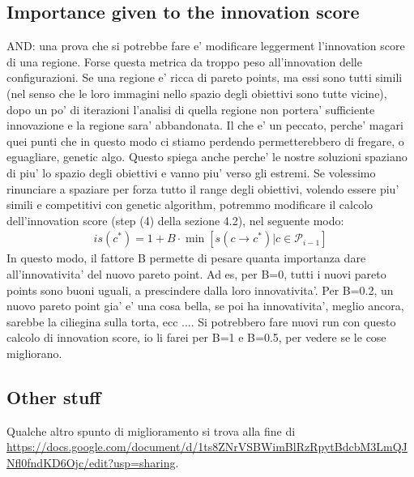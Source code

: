 \subsection{Importance given to the innovation score}
AND: una prova che si potrebbe fare e' modificare leggerment l'innovation score di una regione. Forse questa metrica da troppo peso all'innovation delle configurazioni. Se una regione e' ricca di pareto points, ma essi sono tutti simili (nel senso che le loro immagini nello spazio degli obiettivi sono tutte vicine), dopo un po' di iterazioni l'analisi di quella regione non portera' sufficiente innovazione e la regione sara' abbandonata. Il che e' un peccato, perche' magari quei punti che in questo modo ci stiamo perdendo permetterebbero di fregare, o eguagliare, genetic algo. Questo spiega anche perche' le nostre soluzioni spaziano di piu' lo spazio degli obiettivi e vanno piu' verso gli estremi. Se volessimo rinunciare a spaziare per forza tutto il range degli obiettivi, volendo essere piu' simili e competitivi con genetic algorithm, potremmo modificare il calcolo dell'innovation score (step (4) della sezione 4.2), nel seguente modo:
	\begin{align}
	    is(c^*) = 1 + B\cdot \min[ s(c \rightarrow c^*) | c \in \mathscr{P}_{i-1} ]
	\end{align}
In questo modo, il fattore B permette di pesare quanta importanza dare all'innovativita' del nuovo pareto point. Ad es, per B=0, tutti i nuovi pareto points sono buoni uguali, a prescindere dalla loro innovativita'. Per B=0.2, un nuovo pareto point gia' e' una cosa bella, se poi ha innovativita', meglio ancora, sarebbe la ciliegina sulla torta, ecc .... Si potrebbero fare nuovi run con questo calcolo di innovation score, io li farei per B=1 e B=0.5, per vedere se le cose migliorano.

\subsection{Other stuff}
Qualche altro spunto di miglioramento si trova alla fine di \url{https://docs.google.com/document/d/1ts8ZNrVSBWimBlRzRpytBdcbM3LmQJNfl0fndKD6Ojc/edit?usp=sharing}.

